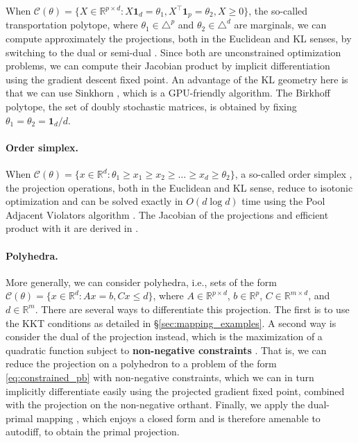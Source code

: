 \documentclass{article}
\def\cC{{\mathcal{C}}}
\def\RR{{\mathbb R}}
\def\ones{{\mathbf{1}}}
\begin{document}
When $\cC(\theta) = \{X \in \RR^{p \times d} \colon X \ones_d = \theta_1, X^\top
\ones_p = \theta_2, X \ge 0\}$, 
the so-called transportation polytope, 
where $\theta_1 \in \triangle^p$ and $\theta_2 \in \triangle^d$ are marginals,
we can compute approximately the projections, both in the Euclidean and KL
senses, by switching to the dual or semi-dual \cite{blondel_2018_ot}. Since both
are unconstrained optimization problems, we can compute their Jacobian product
by implicit differentiation using the gradient descent fixed point. 
An advantage of the KL geometry here is that we can
use Sinkhorn \cite{cuturi_2013_sinkhorn}, which is a GPU-friendly algorithm.
The Birkhoff polytope, the set of doubly stochastic matrices, is obtained by
fixing $\theta_1 = \theta_2 = \ones_d / d$.

\paragraph{Order simplex.}

When $\cC(\theta) = \{x \in \RR^d \colon \theta_1 \ge x_1 \ge x_2 \ge \dots \ge
x_d \ge \theta_2\}$, a so-called order simplex
\cite{grotzinger_1984,blondel_2019_structured}, the projection operations, both
in the Euclidean and KL sense, reduce to isotonic optimization \cite{lim_2016}
and can be solved exactly in $O(d \log d)$ time using the Pool Adjacent
Violators algorithm \cite{best_2000}. The Jacobian of the projections and
efficient product with it are derived in \cite{djolonga_2017,blondel_2020_fast}.

\paragraph{Polyhedra.}

More generally, we can consider polyhedra, i.e., sets of the form
$\cC(\theta) = \{x \in \RR^d \colon A x = b, Cx \le d\}$,
where $A \in \RR^{p \times d}$, $b \in \RR^p$, $C \in \RR^{m \times d}$,
and $d \in \RR^m$. 
There are several ways to differentiate this projection.
The first is to use the KKT conditions as detailed in
\S\ref{sec:mapping_examples}.
A second way is consider the dual of the projection instead, 
which is the maximization of a quadratic function subject to
\textbf{non-negative constraints} \cite[\S 6.2]{parikh_2014}. 
That is, we can reduce the projection on a polyhedron
to a problem of the form \eqref{eq:constrained_pb} with non-negative constraints, 
which we can in turn
implicitly differentiate easily using the projected gradient fixed point,
combined with the projection on the non-negative orthant.
Finally, we apply the dual-primal mapping ,
which enjoys a closed form and is therefore amenable to autodiff,
to obtain the primal projection.
\end{document}
